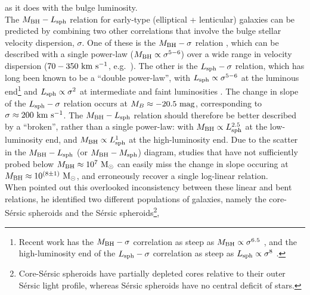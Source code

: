 \documentclass[preprint2]{emulateapj}
\begin{document}
as it does with the bulge luminosity.  \\
The $M_{\rm BH} - L_{\rm sph}$ relation for early-type (elliptical + lenticular) galaxies can be predicted by combining two other correlations that involve 
the bulge stellar velocity dispersion, $\sigma$.
One of these is the $M_{\rm BH} - \sigma$ relation \citep{ferraresemerritt2000,gebhardt2000},
which can be described with a single power-law ($M_{\rm BH} \propto \sigma^{5-6}$) 
over a wide range in velocity dispersion ($70-350~\rm km~s^{-1}$, e.g.~\citealt{graham2011,mcconnell2011,grahamscott2013}).
The other is the $L_{\rm sph} - \sigma$ relation, 
which has long been known to be a ``double power-law'', 
with $L_{\rm sph} \propto \sigma^{5-6}$ at the luminous end\footnote{Recent 
work has the $M_{\rm BH} - \sigma$ correlation as steep as $M_{\rm BH} \propto \sigma^{6.5}$ \citep{savorgnangraham2015},
and the high-luminosity end of the $L_{\rm sph} - \sigma$ correlation as steep as $L_{\rm sph} \propto \sigma^{8}$ \citep{monterodorta2015}.} 
\citep{schechter1980,malumuthkrishner1981,vonderlinden2007,lauer2007lumell,liu2008}
and $L_{\rm sph} \propto \sigma^2$ at intermediate and faint luminosities 
\citep{davies1983,held1992,matkovicguzman2005,derijcke2005,balcells2007screl,chilingarian2008,forbes2008,cody2009,tortora2009,kourkchi2012}. 
The change in slope of the $L_{\rm sph} - \sigma$ relation occurs at $M_B \approx -20.5\rm~mag$, 
corresponding to $\sigma \approx 200~\rm km~s^{-1}$. 
The $M_{\rm BH} - L_{\rm sph}$ relation should therefore be better described by a ``broken'', rather than a single power-law: 
with $M_{\rm BH} \propto L_{\rm sph}^{2.5}$ at the low-luminosity end, 
and $M_{\rm BH} \propto L_{\rm sph}^1$ at the high-luminosity end.  
Due to the scatter in the $M_{\rm BH} - L_{\rm sph}$ (or $M_{\rm BH} - M_{\rm sph}$) diagram, 
studies that have not sufficiently probed below $M_{\rm BH} \approx 10^7\rm~M_\odot$ 
can easily miss the change in slope occuring at $M_{\rm BH} \approx 10^{(8 \pm 1)}\rm~M_\odot$, 
and erroneously recover a single log-linear relation. \\
When \cite{graham2012bent} pointed out this overlooked inconsistency between these linear and bent relations, 
he identified two different populations of galaxies, 
namely the core-S\'ersic spheroids \citep{graham2003coresersicmodel,trujillo2004coresersicmodel} and the S\'ersic 
spheroids\footnote{Core-S\'ersic spheroids have partially depleted cores relative to their outer S\'ersic light profile, 
whereas S\'ersic spheroids have no central deficit of stars.},
\end{document}
